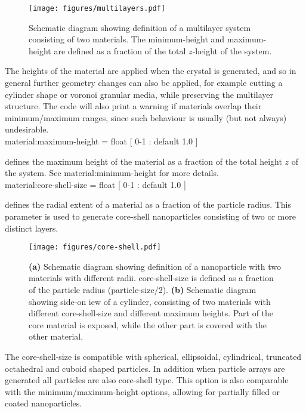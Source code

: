 \begin{figure*}[!h]
\center
\texttt{[image: figures/multilayers.pdf]}
\caption{Schematic diagram showing definition of a multilayer system consisting of two materials. The minimum-height and maximum-height are defined as a fraction of the total $z$-height of the system.}
\label{fig:multilayer}
\end{figure*}

The heights of the material are applied when the crystal is generated, and so in general further geometry changes can also be applied, for example cutting a cylinder shape or voronoi granular media, while preserving the multilayer structure. The code will also print a warning if materials overlap their minimum/maximum ranges, since such behaviour is usually (but not always) undesirable.\\

{\zicf material:maximum-height = float [ 0-1 : default 1.0 ]} defines the maximum height of the material as a fraction of the total height $z$ of the system. See material:minimum-height for more details.\\

{\zicf material:core-shell-size = float [ 0-1 : default 1.0 ]} defines the radial extent of a material as a fraction of the particle radius. This parameter is used to generate core-shell nanoparticles consisting of two or more distinct layers.
\begin{figure*}[!htb]
\center
\texttt{[image: figures/core-shell.pdf]}
\caption{\textbf{(a)} Schematic diagram showing definition of a nanoparticle with two materials with different radii. core-shell-size is defined as a fraction of the particle radius (particle-size/2). \textbf{(b)} Schematic diagram showing side-on iew of a cylinder, consisting of two materials with different core-shell-size and different maximum heights. Part of the core material is exposed, while the other part is covered with the other material.}
\label{fig:multilayer}
\end{figure*}
The core-shell-size is compatible with spherical, ellipsoidal, cylindrical, truncated octahedral and cuboid shaped particles. In addition when particle arrays are generated all particles are also core-shell type. This option is also comparable with the minimum/maximum-height options, allowing for partially filled or coated nanoparticles.\\

